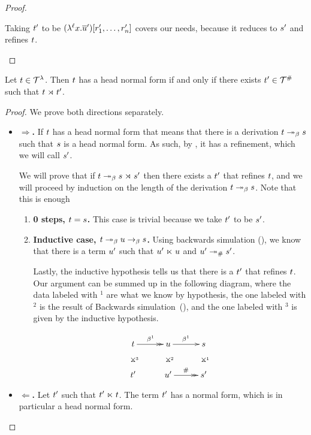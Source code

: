 \begin{proof}
\begin{enumerate}
\begin{enumerate}
      Taking $t'$ to be $(\lambda^{\ell} x. \overline{u}')[r'_1, \hdots, r'_n]$
      covers our needs, because it reduces to $s'$ and refines $t$.
  \end{enumerate}
\end{enumerate}
\end{proof}

\begin{proposition}
Let $t \in \mathcal{T}^{\lambda}$.
Then $t$ has a head normal form if and only if there exists $t' \in \mathcal{T}^{\mathtt{\#}}$ such that $t \mathrel{\rtimes} t'$.
\end{proposition}
\begin{proof} We prove both directions separately.
\begin{itemize}
  \item[] {\bf $\Rightarrow$.} If $t$ has a head normal form that means that there is a derivation $t \mathrel{\twoheadrightarrow_\beta} s$ such that $s$ is a head normal form.
    As such, by , it has a refinement, which we will call $s'$.

    We will prove that if $t \mathrel{\twoheadrightarrow_\beta} s \mathrel{\rtimes} s'$ then
    there exists a $t'$ that refines $t$, and we will proceed by
    induction on the length of the derivation $t \mathrel{\twoheadrightarrow_\beta} s$.
    Note that this is enough
    \begin{enumerate}
      \item {\bf 0 steps, $t = s$.} This case is trivial because we take $t'$ to be $s'$.
      \item {\bf Inductive case, $t \mathrel{\twoheadrightarrow_\beta} u \mathrel{\to_\beta} s$.}
        Using backwards simulation (), we know that
        there is a term $u'$ such that $u' \mathrel{\ltimes} u$ and $u' \mathrel{\twoheadrightarrow}_{\mathtt{\#}} s'$.

        Lastly, the inductive hypothesis tells us that there is a $t'$ that refines $t$.
        Our argument can be summed up in the following diagram,
        where the data labeled with $^1$ are what we know by hypothesis,
        the one labeled with $^2$ is the result of Backwards simulation~(),
        and the one labeled with $^3$ is given by the inductive hypothesis.

        \[
        \xymatrix@C=1cm{
          \tm  \ar@{}[d]|*=0[@]{\rtimes}^{^3} \ar@{->>}[r]^{\beta^1}
            & \tmthree \ar@{}[d]|*=0[@]{\rtimes}^{^2} \ar[r]^{\beta^1}
            & \tmtwo \ar@{}[d]|*=0[@]{\rtimes}^{^1}  \\
          \tm' & \tmthree' \ar@{->>}[r]^{\dist} & \tmtwo' \\
        }
        \]
    \end{enumerate}
  \item[] {\bf $\Leftarrow$.} Let $t'$ such that $t' \mathrel{\ltimes} t$.
    The term $t'$ has a normal form, which is in particular a head normal form.


\end{itemize}
\end{proof}
